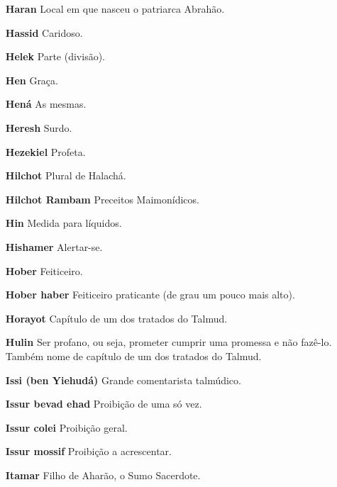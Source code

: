 \begin{itemize}
\item[\textbf{Haran}] Local em que nasceu o patriar­ca Abrahão.

\item[\textbf{Hassid}] Caridoso.

\item[\textbf{Helek}] Parte (divisão).

\item[\textbf{Hen}] Graça.

\item[\textbf{Hená}] As mesmas.

\item[\textbf{Heresh}] Surdo.

\item[\textbf{Hezekiel}] Profeta.

\item[\textbf{Hilchot}] Plural de Halachá.

\item[\textbf{Hilchot Rambam}] Preceitos Maimo­nídicos.

\item[\textbf{Hin}] Medida para líquidos.

\item[\textbf{Hishamer}] Alertar-se.

\item[\textbf{Hober}] Feiticeiro.

\item[\textbf{Hober haber}] Feiticeiro praticante (de grau um pouco mais
alto).

\item[\textbf{Horayot}] Capítulo de um dos trata­dos do Talmud.

\item[\textbf{Hulin}] Ser profano, ou seja, prome­ter cumprir uma promessa e
não fazê-lo. Também nome de capítulo de um dos tratados do Talmud.

\item[\textbf{Issi (ben Yiehudá)}] Grande comen­tarista talmúdico.

\item[\textbf{Issur bevad ehad}] Proibição de uma só vez.

\item[\textbf{Issur colei}] Proibição geral.

\item[\textbf{Issur mossif}] Proibição a acrescen­tar.

\item[\textbf{Itamar}] Filho de Aharão, o Sumo Sa­cerdote.


\end{itemize}

